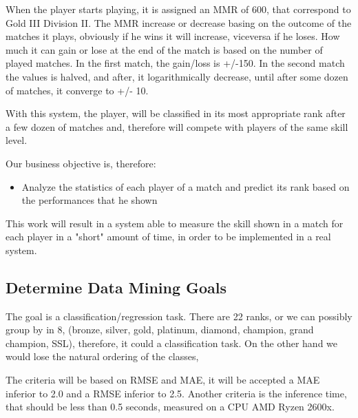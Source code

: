 When the player starts playing, it is assigned an MMR of 600, that correspond to Gold III Division II. The MMR increase or decrease basing on the outcome of the matches it plays, obviously if he wins it will increase, viceversa if he loses. How much it can gain or lose at the end of the match is based on the number of played matches. In the first match, the gain/loss is +/-150. In the second match the values is halved, and after, it logarithmically decrease, until after some dozen of matches, it converge to +/- 10.

With this system, the player, will be classified in its most appropriate rank after a few dozen of matches and, therefore will compete with players of the same skill level.

Our business objective is, therefore:
\begin{itemize}
    \item Analyze the statistics of each player of a match and predict its rank based on the performances that he shown
\end{itemize}


This work will result in a system able to measure the skill shown in a match for each player in a "short" amount of time, in order to be implemented in a real system.

\subsection{Determine Data Mining Goals}
\label{sec:min_goal}
The goal is a classification/regression task. There are 22 ranks, or we can possibly group by in 8, (bronze, silver, gold, platinum, diamond, champion, grand champion, SSL), therefore, it could a classification task. On the other hand we would lose the natural ordering of the classes, 

The criteria will be based on RMSE and MAE, it will be accepted a MAE inferior to 2.0 and a RMSE inferior to 2.5. 
Another criteria is the inference time, that should be less than 0.5 seconds, measured on a CPU AMD Ryzen 2600x.


